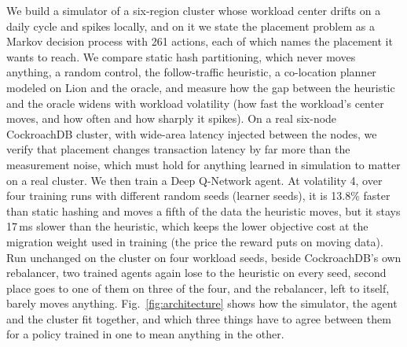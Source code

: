 We build a simulator of a six-region cluster whose workload center drifts on a
daily cycle and spikes locally, and on it we state the placement problem as a
Markov decision process with 261 actions, each of which names the placement it
wants to reach. We compare static hash partitioning, which never moves anything, a
random control, the follow-traffic heuristic, a co-location planner modeled on
Lion and the oracle, and measure how the gap between the heuristic and the
oracle widens with workload volatility (how fast the workload's center moves,
and how often and how sharply it spikes). On a real six-node CockroachDB
cluster, with wide-area latency injected between the nodes, we verify that
placement changes transaction latency by far more than the measurement noise,
which must hold for anything learned in simulation to matter on a real
cluster. We then train a Deep Q-Network agent. At volatility 4, over four
training runs with different random seeds (learner seeds), it is 13.8\% faster
than static hashing and moves a fifth of the data the heuristic moves, but it
stays 17\,ms slower than the heuristic, which keeps the lower objective cost at
the migration weight used in training (the price the reward puts on moving
data). Run unchanged on the cluster on four workload seeds, beside
CockroachDB's own rebalancer, two trained agents again lose to the heuristic on
every seed, second place goes to one of them on three of the four, and the
rebalancer, left to itself, barely moves anything.
Fig.~\ref{fig:architecture} shows how the simulator, the agent and the
cluster fit together, and which three things have to agree between them for a
policy trained in one to mean anything in the other.
